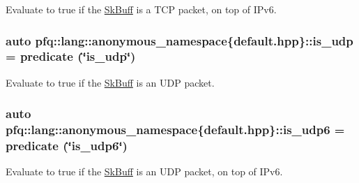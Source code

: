 Evaluate to {\ttfamily true} if the \hyperlink{structpfq_1_1lang_1_1SkBuff}{Sk\+Buff} is a T\+CP packet, on top of I\+Pv6. 

\subsubsection[{\texorpdfstring{is\+\_\+udp}{is_udp}}]{\setlength{\rightskip}{0pt plus 5cm}auto pfq\+::lang\+::anonymous\+\_\+namespace\{default.\+hpp\}\+::is\+\_\+udp = {\bf predicate} (\char`\"{}is\+\_\+udp\char`\"{})}\hypertarget{namespacepfq_1_1lang_1_1anonymous__namespace_02default_8hpp_03_a42701f36d9dde7f3636b90244d520a16}{}\label{namespacepfq_1_1lang_1_1anonymous__namespace_02default_8hpp_03_a42701f36d9dde7f3636b90244d520a16}


Evaluate to {\ttfamily true} if the \hyperlink{structpfq_1_1lang_1_1SkBuff}{Sk\+Buff} is an U\+DP packet. 

\subsubsection[{\texorpdfstring{is\+\_\+udp6}{is_udp6}}]{\setlength{\rightskip}{0pt plus 5cm}auto pfq\+::lang\+::anonymous\+\_\+namespace\{default.\+hpp\}\+::is\+\_\+udp6 = {\bf predicate} (\char`\"{}is\+\_\+udp6\char`\"{})}\hypertarget{namespacepfq_1_1lang_1_1anonymous__namespace_02default_8hpp_03_a8f3f79760f7be2ce30db5025bff887a6}{}\label{namespacepfq_1_1lang_1_1anonymous__namespace_02default_8hpp_03_a8f3f79760f7be2ce30db5025bff887a6}


Evaluate to {\ttfamily true} if the \hyperlink{structpfq_1_1lang_1_1SkBuff}{Sk\+Buff} is an U\+DP packet, on top of I\+Pv6. 

